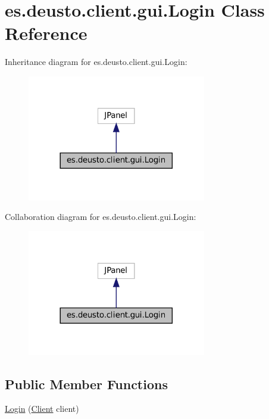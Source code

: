 \hypertarget{classes_1_1deusto_1_1client_1_1gui_1_1_login}{}\section{es.\+deusto.\+client.\+gui.\+Login Class Reference}
\label{classes_1_1deusto_1_1client_1_1gui_1_1_login}


Inheritance diagram for es.\+deusto.\+client.\+gui.\+Login\+:
\nopagebreak
\begin{figure}[H]
\begin{center}
\leavevmode
\includegraphics[width=221pt]{classes_1_1deusto_1_1client_1_1gui_1_1_login__inherit__graph}
\end{center}
\end{figure}


Collaboration diagram for es.\+deusto.\+client.\+gui.\+Login\+:
\nopagebreak
\begin{figure}[H]
\begin{center}
\leavevmode
\includegraphics[width=221pt]{classes_1_1deusto_1_1client_1_1gui_1_1_login__coll__graph}
\end{center}
\end{figure}
\subsection*{Public Member Functions}
\begin{DoxyCompactItemize}
\item 
\mbox{\hyperlink{classes_1_1deusto_1_1client_1_1gui_1_1_login_af565f7accded6e1e3d09b03d6baeaeb4}{Login}} (\mbox{\hyperlink{classes_1_1deusto_1_1client_1_1_client}{Client}} client)
\end{DoxyCompactItemize}


